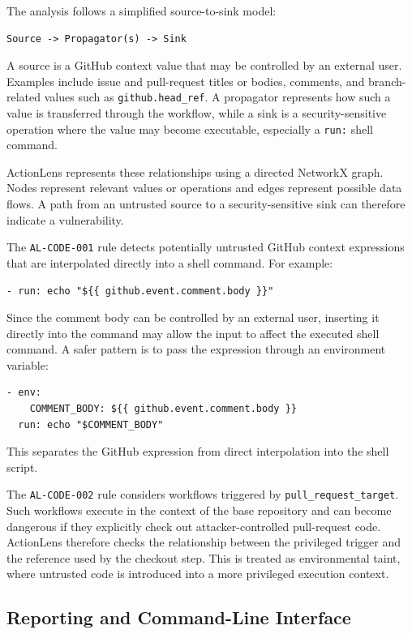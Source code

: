 \documentclass{article}
\begin{document}
The analysis follows a simplified source-to-sink model:
\begin{verbatim}
Source -> Propagator(s) -> Sink
\end{verbatim}

A source is a GitHub context value that may be controlled by an
external user. Examples include issue and pull-request titles or bodies,
comments, and branch-related values such as \texttt{github.head\_ref}. A
propagator represents how such a value is transferred through the
workflow, while a sink is a security-sensitive operation where the
value may become executable, especially a \texttt{run:} shell command.

ActionLens represents these relationships using a directed NetworkX graph.
Nodes represent relevant values or operations and edges represent possible
data flows. A path from an untrusted source to a security-sensitive sink can
therefore indicate a vulnerability.

The \texttt{AL-CODE-001} rule detects potentially untrusted GitHub context
expressions that are interpolated directly into a shell command. For example:
\begin{verbatim}
- run: echo "${{ github.event.comment.body }}"
\end{verbatim}

Since the comment body can be controlled by an external user, inserting it directly into the command may allow the input to affect the executed shell command. A safer pattern is to pass the expression through an environment variable:
\begin{verbatim}
- env:
    COMMENT_BODY: ${{ github.event.comment.body }}
  run: echo "$COMMENT_BODY"
\end{verbatim}

This separates the GitHub expression from direct interpolation into the shell script. 

The \texttt{AL-CODE-002} rule considers workflows triggered by
\texttt{pull\_request\_target}. Such workflows execute in the context of the base repository and can become dangerous if they explicitly check out attacker-controlled pull-request code. ActionLens therefore checks the relationship between the privileged trigger and the reference used by the checkout step. This is treated as environmental taint, where untrusted code is introduced into a more privileged execution context.

\subsection{Reporting and Command-Line Interface}
\end{document}
